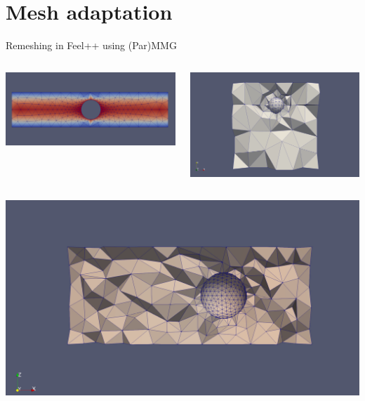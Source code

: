 \documentclass{beamer}
\begin{document}
	\section{Mesh adaptation}
	\begin{frame}{Remeshing in Feel++ using (Par)MMG}
		\begin{columns}
			\begin{column}{0.49\textwidth}
				\includegraphics[width=\linewidth]{figures/2d_remeshing.png}
			\end{column}
			\begin{column}{0.49\textwidth}
					\includegraphics[width=\linewidth]{figures/DRIVEN_CAVITY.png}
			\end{column}
		\end{columns}
		\begin{columns}
			\begin{column}{0.5\textwidth}
					\includegraphics[width=\linewidth]{figures/3D_SLIDING.png}

\end{column}
\end{columns}
\end{frame}
\end{document}
